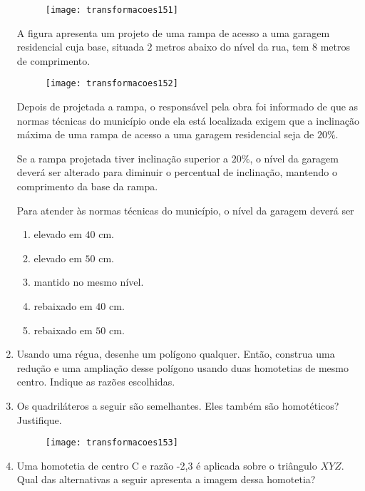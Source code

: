 \begin{enumerate}
\begin{figure}[H]
\centering

\texttt{[image: transformacoes151]}
\end{figure}

A figura apresenta um projeto de uma rampa de acesso a uma garagem residencial cuja base, situada $2$ metros abaixo do nível da rua, tem $8$ metros de comprimento.

\begin{figure}[H]
\centering

\texttt{[image: transformacoes152]}
\end{figure}

Depois de projetada a rampa, o responsável pela obra foi informado de que as normas técnicas do município onde ela está localizada exigem que a inclinação máxima de uma rampa de acesso a uma garagem residencial seja de $20\%$. 

Se a rampa projetada tiver inclinação superior a $20\%$, o nível da garagem deverá ser alterado para diminuir o percentual de inclinação, mantendo o comprimento da base da rampa.

Para atender às normas técnicas do município, o nível da garagem deverá ser 
\begin{enumerate}
\item elevado em $40$ cm.
\item elevado em $50$ cm.
\item mantido no mesmo nível.
\item rebaixado em $40$ cm.
\item rebaixado em $50$ cm.
\end{enumerate}


\item Usando uma régua, desenhe um polígono qualquer. Então, construa uma redução e uma ampliação desse polígono usando duas homotetias de mesmo centro. Indique as razões escolhidas. 

\item  Os quadriláteros a seguir são semelhantes. Eles também são homotéticos? Justifique.
\begin{figure}[H]
\centering

\texttt{[image: transformacoes153]}
\end{figure}


\item Uma homotetia de centro C e razão -2,3 é aplicada sobre o triângulo $XYZ$. Qual das alternativas a seguir apresenta a imagem dessa homotetia?


\end{enumerate}
